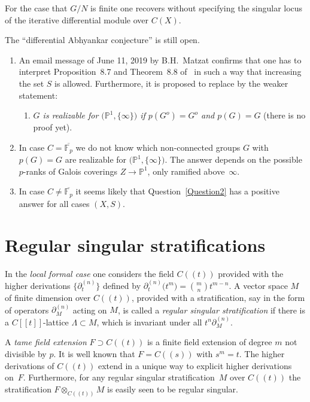 \documentclass[10pt,a4paper]{amsart}
\numberwithin{equation}{section}
\begin{document}
For the case that $G/N$ is finite one recovers \cite[Proposition~8.7]{Ma-vdP2} without specifying the singular locus of the iterative differential module over $C(X)$.

\begin{Remarks} The ``differential Abhyankar conjecture'' is still open.
\begin{enumerate}\itemsep=0pt
\item[(1)] An email message of June 11, 2019 by B.H.~Matzat confirms that one has to interpret Proposition~8.7 and Theorem~8.8 of~\cite{Ma-vdP2} in such a way that increasing the set $S$ is allowed. Furthermore, it is proposed to replace \cite[Theorem~8.11]{Ma-vdP2} by the weaker statement:
 \begin{enumerate}\itemsep=0pt
 \item[]{\it $G$ is realizable for $\big(\mathbb{P}^1,\{\infty \}\big)$ if $p(G^o)=G^o$ and $p(G)=G$} (there is no proof yet).
 \end{enumerate}
\item[(2)] In case $C=\overline{\mathbb{F}_p}$ we do not know which non-connected groups $G$ with $p(G)=G$ are realizable for $\big(\mathbb{P}^1,\{\infty \}\big)$. The answer depends on the possible $p$-ranks of Galois coverings $Z\rightarrow \mathbb{P}^1$, only ramified above~$\infty$.
\item[(3)] In case $C\neq \overline{\mathbb{F}_p}$ it seems likely that Question~\ref{Question2} has a positive answer for all cases $(X,S)$.
\end{enumerate}
\end{Remarks}

\section{Regular singular stratifications}\label{section3}

In the {\it local formal case} one considers the field $C((t))$ provided with the higher derivations $\big\{\partial_t ^{(n)}\big\}$ defined by $\partial _t^{(n)}\big(t^m\big)={m\choose n}t^{m-n}$. A vector space $M$ of finite dimension over $C((t))$, provided with a stratification, say in the form of operators $\partial_M^{(n)}$ acting on $M$, is called a {\it regular singular stratification} if there is a $C[[t]]$-lattice $\Lambda \subset M$, which is invariant under all $t^n\partial_M^{(n)}$.

A {\it tame field extension} $F\supset C((t))$ is a finite field extension of degree $m$ not divisible by $p$. It is well known that $F=C((s))$ with $s^m=t$. The higher derivations of $C((t))$ extend in a unique way to explicit higher derivations on~$F$. Furthermore, for any regular singular stratification~$M$ over $C((t))$ the stratification $F\otimes _{C((t))}M$ is easily seen to be regular singular.
\end{document}
